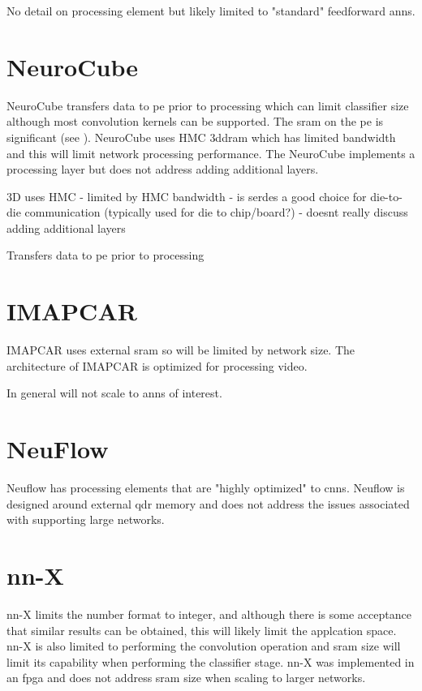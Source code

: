 {{{No detail on processing element but likely limited to "standard" feedforward \acp{ann}.


\section[NeuroCube]{NeuroCube{\cite{kim2016neurocube}}}
NeuroCube\cite{kim2016neurocube} transfers data to \ac{pe} prior to processing which can limit classifier size although most
convolution kernels can be supported.
The \ac{sram} on the \ac{pe} is significant (see ).
NeuroCube uses HMC \ac{3ddram} which has limited bandwidth and this will limit network processing performance.
The NeuroCube implements a processing layer but does not address adding additional layers. 

3D uses HMC
 - limited by HMC bandwidth
 - is serdes a good choice for die-to-die communication (typically used for die to chip/board?)
 - doesnt really discuss adding additional layers

Transfers data to \ac{pe} prior to processing


\section[IMAPCAR]{IMAPCAR \cite{kyo2011imapcar}}
IMAPCAR uses external \ac{sram} so will be limited by network size.
The architecture of IMAPCAR is optimized for processing video.

In general will not scale to \acp{ann} of interest.


\section{NeuFlow \cite{farabet2011neuflow}}
Neuflow\cite{farabet2011neuflow} has processing elements that are "highly optimized" to \acp{cnn}.
Neuflow is designed around external \ac{qdr} memory and does not address the issues associated with supporting large networks.


\section[nn-X]{nn-X \cite{gokhale2014240}}
nn-X\cite{gokhale2014240} limits the number format to integer, and although there is some acceptance that similar
results can be obtained, this will likely limit the applcation space. nn-X is also limited to performing the convolution operation
and \ac{sram} size will limit its capability when performing the classifier stage.
nn-X was implemented in an fpga and does not address \ac{sram} size when scaling to larger networks.


}}}

